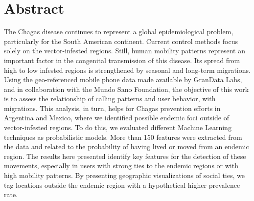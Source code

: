 \chapter{Abstract}
\label{cha:abstract}

The Chagas disease continues to represent a global epidemiological problem, particularly for the South American continent.
Current control methods focus solely on the vector-infested regions. Still, human mobility patterns represent an important factor in the congenital transmission of this disease. 
Its spread from high to low infested regions is strengthened by seasonal and long-term migrations. Using the geo-referenced mobile phone data made available by GranData Labs, and in collaboration with the Mundo Sano Foundation, the objective of this work is to assess the relationship of calling patterns and user behavior, with migrations. 
This analysis, in turn, helps for Chagas prevention efforts in Argentina and Mexico, where we identified possible endemic foci outside of vector-infested regions. 
To do this, we evaluated different Machine Learning techniques as probabilistic models. 
More than 150 features were extracted from the data and related to the probability of having lived or moved from an endemic region. 
The results here presented identify key features for the detection of these movements, especially in users with strong ties to the endemic regions or with high mobility patterns. 
By presenting geographic visualizations of social ties, we tag locations outside the endemic region with a hypothetical higher prevalence rate.